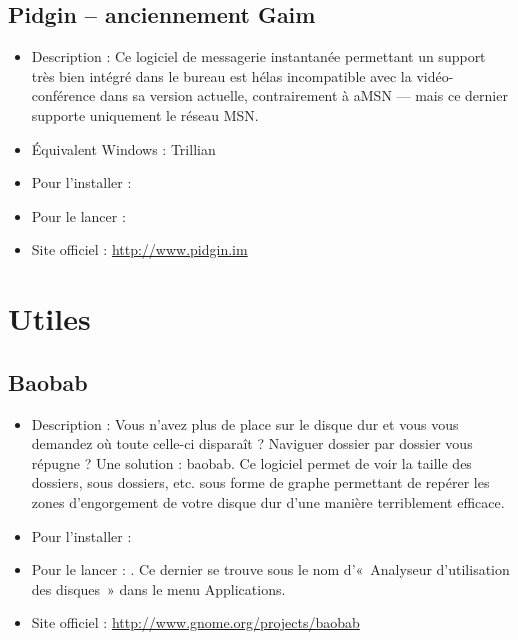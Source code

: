 \subsection{Pidgin -- anciennement Gaim}
\label{RefPidgin}
\begin{itemize}
\begingroup
{}
\item Description : Ce logiciel de messagerie instantanée permettant un support  très bien intégré dans le bureau  est hélas incompatible avec la vidéo-conférence dans sa version actuelle, contrairement à aMSN --- mais ce dernier supporte uniquement le réseau MSN.{\par}
\item Équivalent Windows : Trillian{\par}
\item Pour l'installer : 
\item Pour le lancer : 
\item Site officiel : \url{http://www.pidgin.im}{\par}
\endgroup
\end{itemize}
\section{Utiles}

\subsection{Baobab}
\begin{itemize}
\begingroup
{}
\item Description : Vous n'avez plus de place sur le disque dur et vous vous demandez où toute celle-ci disparaît ? Naviguer dossier par dossier vous répugne ? Une solution : baobab. Ce logiciel permet de voir la taille des dossiers, sous dossiers, etc. sous forme de graphe permettant de repérer les zones d'engorgement de votre disque dur d'une manière terriblement efficace.{\par}
\endgroup
\item Pour l'installer : 
\item Pour le lancer : . Ce dernier se trouve sous le nom d'«~Analyseur d'utilisation des disques~» dans le menu Applications.{\par}
\item Site officiel : \url{http://www.gnome.org/projects/baobab}{\par}
\end{itemize}
